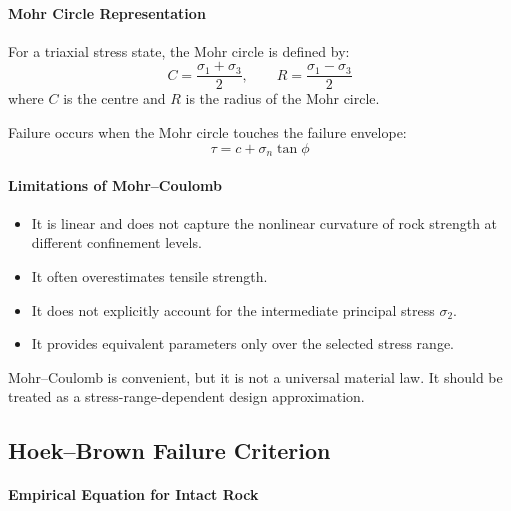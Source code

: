 \paragraph{Mohr Circle Representation}

For a triaxial stress state, the Mohr circle is defined by:
\[
C = \frac{\sigma_1+\sigma_3}{2},
\qquad
R = \frac{\sigma_1-\sigma_3}{2}
\]
where \(C\) is the centre and \(R\) is the radius of the Mohr circle.

Failure occurs when the Mohr circle touches the failure envelope:
\[
\tau = c + \sigma_n \tan\phi
\]

\paragraph{Limitations of Mohr--Coulomb}

\begin{itemize}
 \item It is linear and does not capture the nonlinear curvature of rock strength at
 different confinement levels.
 \item It often overestimates tensile strength.
 \item It does not explicitly account for the intermediate principal stress \(\sigma_2\).
 \item It provides equivalent parameters only over the selected stress range.
\end{itemize}

\begin{warnbox}
Mohr--Coulomb is convenient, but it is not a universal material law. It should be treated
as a stress-range-dependent design approximation.
\end{warnbox}

\subsection{Hoek--Brown Failure Criterion}

\paragraph{Empirical Equation for Intact Rock}

